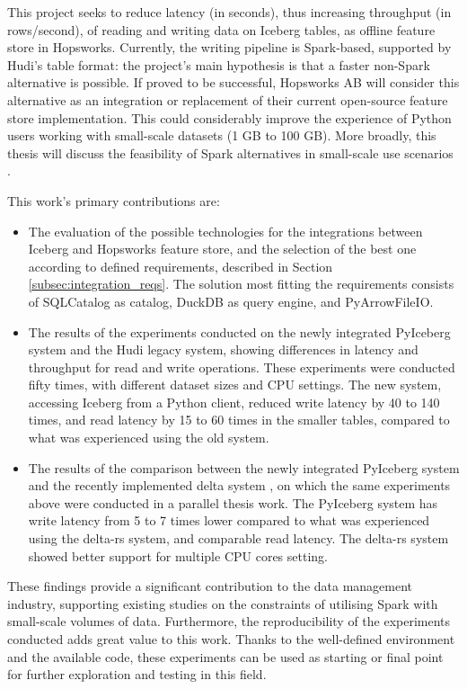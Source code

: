 This project seeks to reduce latency (in seconds), thus increasing throughput (in rows/second), of reading and writing data on Iceberg tables, as offline feature store in Hopsworks. Currently, the writing pipeline is Spark-based, supported by Hudi's table format: the project's main hypothesis is that a faster non-Spark alternative is possible. If proved to be successful, Hopsworks AB will consider this alternative as an integration or replacement of their current open-source feature store implementation. This could considerably improve the experience of Python users working with small-scale datasets (1 GB to 100 GB). More broadly, this thesis will discuss the feasibility of Spark alternatives in small-scale use scenarios \cite{manfrediReducingReadWrite2024}.


This work's primary contributions are:
\begin{itemize}
    \item The evaluation of the possible technologies for the integrations between Iceberg and Hopsworks feature store, and the selection of the best one according to defined requirements, described in Section \ref{subsec:integration_reqs}. The solution most fitting the requirements consists of SQLCatalog as catalog, DuckDB as query engine, and PyArrowFileIO.
    \item The results of the experiments conducted on the newly integrated PyIceberg system and the Hudi legacy system, showing differences in latency and throughput for read and write operations. These experiments were conducted fifty times, with different dataset sizes and \gls{CPU} settings. The new system, accessing Iceberg from a Python client, reduced write latency by 40 to 140 times, and read latency by 15 to 60 times in the smaller tables, compared to what was experienced using the old system.
    \item The results of the comparison between the newly integrated PyIceberg system and the recently implemented delta system \cite{manfrediReducingReadWrite2024}, on which the same experiments above were conducted in a parallel thesis work. The PyIceberg system has write latency from 5 to 7 times lower compared to what was experienced using the delta-rs system, and comparable read latency. The delta-rs system showed better support for multiple \gls{CPU} cores setting.
\end{itemize}

These findings provide a significant contribution to the data management industry, supporting existing studies on the constraints of utilising Spark with small-scale volumes of data. Furthermore, the reproducibility of the experiments conducted adds great value to this work. Thanks to the well-defined environment and the available code, these experiments can be used as starting or final point for further exploration and testing in this field. 